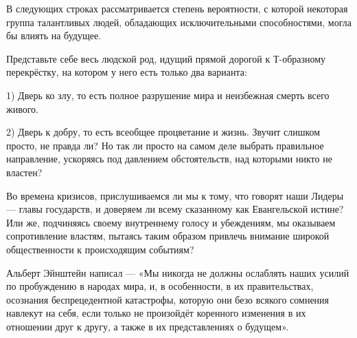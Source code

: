 \documentclass[a4paper,12pt]{book}
\begin{document}
В следующих строках рассматривается степень вероятности, с которой некоторая группа талантливых людей, обладающих исключительными способностями, могла бы влиять на будущее.\\
\par
Представьте себе весь людской род, идущий прямой дорогой к Т-образному перекрёстку, на котором у него есть только два варианта:
\par
1) Дверь ко злу, то есть полное разрушение мира и неизбежная смерть всего живого.
\par
2) Дверь к добру, то есть всеобщее процветание и жизнь.
Звучит слишком просто, не правда ли? Но так ли просто на самом деле выбрать правильное направление, ускоряясь под давлением обстоятельств, над которыми никто не властен?\\
\par
Во времена кризисов, прислушиваемся ли мы к тому, что говорят наши Лидеры — главы государств, и доверяем ли всему сказанному как Евангельской истине? Или же, подчиняясь своему внутреннему голосу и убеждениям, мы оказываем сопротивление властям, пытаясь таким образом привлечь внимание широкой общественности к происходящим событиям?\\
\par
Альберт Эйнштейн написал — «Мы никогда не должны ослаблять наших усилий по пробуждению в народах мира, и, в особенности, в их правительствах, осознания беспрецедентной катастрофы, которую они безо всякого сомнения навлекут на себя, если только не произойдёт коренного изменения в их отношении друг к другу, а также в их представлениях о будущем».
\end{document}
